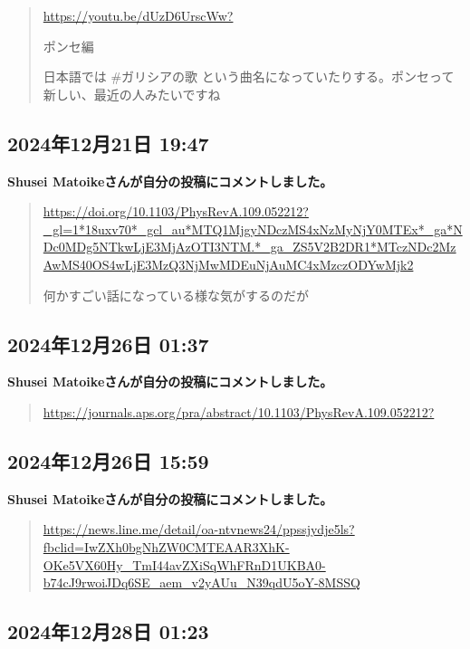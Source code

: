 \begin{quote}
\url{https://youtu.be/dUzD6UrscWw?}

ポンセ編

日本語では \#ガリシアの歌 という曲名になっていたりする。ポンセって新しい、最近の人みたいですね
\end{quote}

\subsection*{2024年12月21日 19:47}

\textbf{Shusei Matoikeさんが自分の投稿にコメントしました。}

\begin{quote}
\url{https://doi.org/10.1103/PhysRevA.109.052212?_gl=1*18uxv70*_gcl_au*MTQ1MjgyNDczMS4xNzMyNjY0MTEx*_ga*NDc0MDg5NTkwLjE3MjAzOTI3NTM.*_ga_ZS5V2B2DR1*MTczNDc2MzAwMS40OS4wLjE3MzQ3NjMwMDEuNjAuMC4xMzczODYwMjk2}

何かすごい話になっている様な気がするのだが
\end{quote}

\subsection*{2024年12月26日 01:37}

\textbf{Shusei Matoikeさんが自分の投稿にコメントしました。}

\begin{quote}
\url{https://journals.aps.org/pra/abstract/10.1103/PhysRevA.109.052212?}
\end{quote}

\subsection*{2024年12月26日 15:59}

\textbf{Shusei Matoikeさんが自分の投稿にコメントしました。}

\begin{quote}
\url{https://news.line.me/detail/oa-ntvnews24/ppssjydje5ls?fbclid=IwZXh0bgNhZW0CMTEAAR3XhK-OKe5VX60Hy_TmI44avZXiSqWhFRnD1UKBA0-b74cJ9rwoiJDq6SE_aem_v2yAUu_N39qdU5oY-8MSSQ}
\end{quote}

\subsection*{2024年12月28日 01:23}

